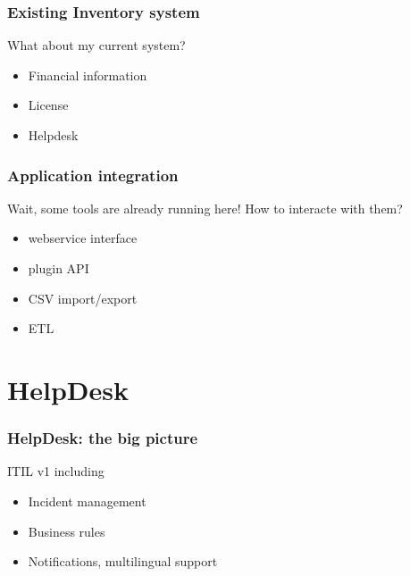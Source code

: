 \documentclass{beamer}
\begin{document}
\begin{frame}

    \frametitle{Existing Inventory system}

    \begin{block}{What about my current system?}
        \begin{itemize}
            \item Financial information
            \item License
            \item Helpdesk
        \end{itemize}
    \end{block}

\end{frame}

\begin{frame}

    \frametitle{Application integration}

    \begin{block}{Wait, some tools are already running here! How to interacte with them?}
        \begin{itemize}
            \item webservice interface
            \item plugin API
            \item CSV import/export
            \item ETL
        \end{itemize}
    \end{block}

\end{frame}


\section{HelpDesk}

\begin{frame}

    \frametitle{HelpDesk: the big picture}

    \begin{block}{ITIL v1 including}
        \begin{itemize}
            \item Incident management
            \item Business rules
            \item Notifications, multilingual support
        \end{itemize}
    \end{block}


\end{frame}
\end{document}
